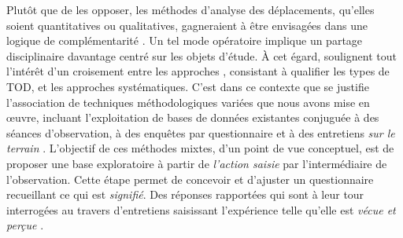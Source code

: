 \begin{refsegment}
Plutôt que de les opposer, les méthodes d’analyse des déplacements, qu’elles soient quantitatives ou qualitatives, gagneraient à être envisagées dans une logique de complémentarité \textcolor{blue}{\autocite[6]{klein_mobilites_2007}}. Un tel mode opératoire implique un partage disciplinaire davantage centré sur les objets d’étude. À cet égard, \textcolor{blue}{\textcite[4]{higgins_forty_2016}} soulignent tout l’intérêt d’un croisement entre les approches , consistant à qualifier les types de \acrshort{TOD}, et les approches  systématiques. C’est dans ce contexte que se justifie l’association de techniques méthodologiques variées que nous avons mise en œuvre, incluant l’exploitation de bases de données existantes conjuguée à des séances d’observation, à des enquêtes par questionnaire et à des entretiens \textsl{sur le terrain} \textcolor{blue}{\autocite[128]{dureau_lobservation_2014}}. L’objectif de ces méthodes mixtes, d’un point de vue conceptuel, est de proposer une base exploratoire à partir de \textsl{l'action saisie} par l'intermédiaire de l'observation. Cette étape permet de concevoir et d'ajuster un questionnaire recueillant ce qui est \textsl{signifié}. Des réponses rapportées qui sont à leur tour interrogées au travers d'entretiens saisissant l'expérience telle qu'elle est \textsl{vécue et perçue} \textcolor{blue}{\autocite[215]{paugam_enquete_2012}}.%


\end{refsegment}
